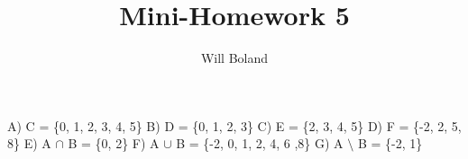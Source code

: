 \documentclass{article}
\begin{document}
\title{Mini-Homework 5}
\author{Will Boland}
\maketitle

A) C = \{0, 1, 2, 3, 4, 5\}\newline
B) D = \{0, 1, 2, 3\}\newline
C) E = \{2, 3, 4, 5\}\newline
D) F = \{-2, 2, 5, 8\}\newline
E) A $\cap$ B = \{0, 2\}\newline
F) A $\cup$ B = \{-2, 0, 1, 2, 4, 6 ,8\}\newline
G) A $\setminus$ B = \{-2, 1\}\newline


\enddocument
\end{document}
